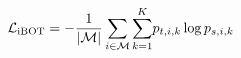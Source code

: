 \documentclass[border=7pt]{standalone}
\begin{document}
\color{ink}
$\displaystyle \begin{gathered}
\mathcal L_{\rm iBOT}= -\frac{1}{|\mathcal M|}\sum_{i\in\mathcal M}\sum_{k=1}^{K}\!p_{t,i,k}\log p_{s,i,k}
\end{gathered}$
\end{document}
